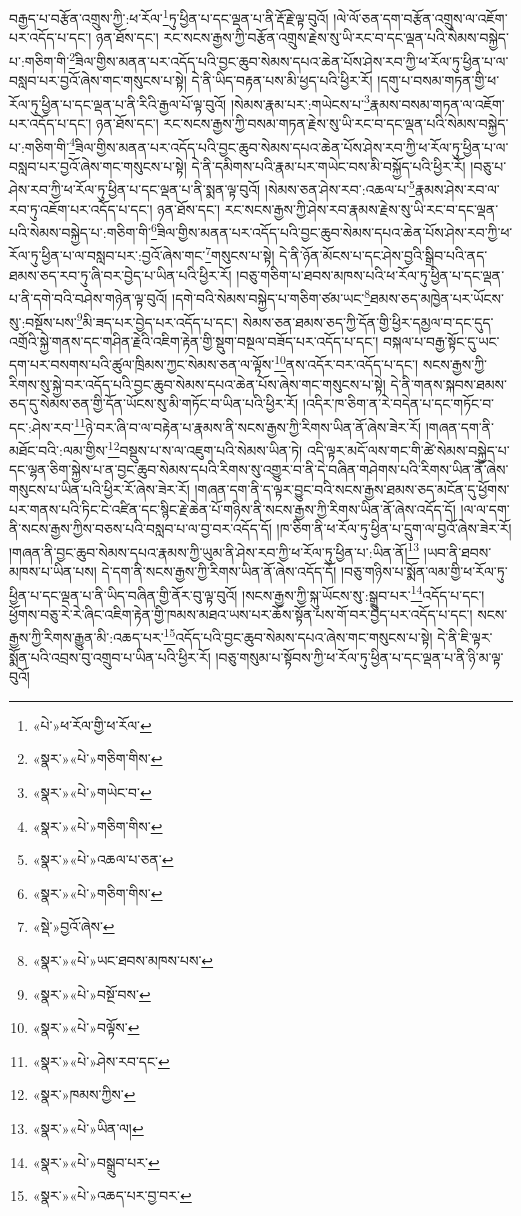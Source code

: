 བརྒྱད་པ་བརྩོན་འགྲུས་ཀྱི་:ཕ་རོལ་\footnote{«པེ་»ཕ་རོལ་གྱི་ཕ་རོལ་}ཏུ་ཕྱིན་པ་དང་ལྡན་པ་ནི་རྡོ་རྗེ་ལྟ་བུའོ། །ལེ་ལོ་ཅན་དག་བརྩོན་འགྲུས་ལ་འཇོག་པར་འདོད་པ་དང་། ཉན་ཐོས་དང་། རང་སངས་རྒྱས་ཀྱི་བརྩོན་འགྲུས་རྗེས་སུ་ཡི་རང་བ་དང་ལྡན་པའི་སེམས་བསྐྱེད་པ་:གཅིག་གི་\footnote{«སྣར་»«པེ་»གཅིག་གིས་}ཟིལ་གྱིས་མནན་པར་འདོད་པའི་བྱང་ཆུབ་སེམས་དཔའ་ཆེན་པོས་ཤེས་རབ་ཀྱི་ཕ་རོལ་ཏུ་ཕྱིན་པ་ལ་བསླབ་པར་བྱའོ་ཞེས་གང་གསུངས་པ་སྟེ། དེ་ནི་ཡིད་བརྟན་པས་མི་ཕྱད་པའི་ཕྱིར་རོ། །དགུ་པ་བསམ་གཏན་གྱི་ཕ་རོལ་ཏུ་ཕྱིན་པ་དང་ལྡན་པ་ནི་རིའི་རྒྱལ་པོ་ལྟ་བུའོ། །སེམས་རྣམ་པར་:གཡེངས་པ་\footnote{«སྣར་»«པེ་»གཡེང་བ་}རྣམས་བསམ་གཏན་ལ་འཇོག་པར་འདོད་པ་དང་། ཉན་ཐོས་དང་། རང་སངས་རྒྱས་ཀྱི་བསམ་གཏན་རྗེས་སུ་ཡི་རང་བ་དང་ལྡན་པའི་སེམས་བསྐྱེད་པ་:གཅིག་གི་\footnote{«སྣར་»«པེ་»གཅིག་གིས་}ཟིལ་གྱིས་མནན་པར་འདོད་པའི་བྱང་ཆུབ་སེམས་དཔའ་ཆེན་པོས་ཤེས་རབ་ཀྱི་ཕ་རོལ་ཏུ་ཕྱིན་པ་ལ་བསླབ་པར་བྱའོ་ཞེས་གང་གསུངས་པ་སྟེ། དེ་ནི་དམིགས་པའི་རྣམ་པར་གཡེང་བས་མི་བསྐྱོད་པའི་ཕྱིར་རོ། །བཅུ་པ་ཤེས་རབ་ཀྱི་ཕ་རོལ་ཏུ་ཕྱིན་པ་དང་ལྡན་པ་ནི་སྨན་ལྟ་བུའོ། །སེམས་ཅན་ཤེས་རབ་:འཆལ་པ་\footnote{«སྣར་»«པེ་»འཆལ་པ་ཅན་}རྣམས་ཤེས་རབ་ལ་རབ་ཏུ་འཇོག་པར་འདོད་པ་དང་། ཉན་ཐོས་དང་། རང་སངས་རྒྱས་ཀྱི་ཤེས་རབ་རྣམས་རྗེས་སུ་ཡི་རང་བ་དང་ལྡན་པའི་སེམས་བསྐྱེད་པ་:གཅིག་གི་\footnote{«སྣར་»«པེ་»གཅིག་གིས་}ཟིལ་གྱིས་མནན་པར་འདོད་པའི་བྱང་ཆུབ་སེམས་དཔའ་ཆེན་པོས་ཤེས་རབ་ཀྱི་ཕ་རོལ་ཏུ་ཕྱིན་པ་ལ་བསླབ་པར་:བྱའོ་ཞེས་གང་\footnote{«སྡེ་»བྱའོ་ཞེས་}གསུངས་པ་སྟེ། དེ་ནི་ཉོན་མོངས་པ་དང་ཤེས་བྱའི་སྒྲིབ་པའི་ནད་ཐམས་ཅད་རབ་ཏུ་ཞི་བར་བྱེད་པ་ཡིན་པའི་ཕྱིར་རོ། །བཅུ་གཅིག་པ་ཐབས་མཁས་པའི་ཕ་རོལ་ཏུ་ཕྱིན་པ་དང་ལྡན་པ་ནི་དགེ་བའི་བཤེས་གཉེན་ལྟ་བུའོ། །དགེ་བའི་སེམས་བསྐྱེད་པ་གཅིག་ཙམ་ཡང་\footnote{«སྣར་»«པེ་»ཡང་ཐབས་མཁས་པས་}ཐམས་ཅད་མཁྱེན་པར་ཡོངས་སུ་:བསྔོས་པས་\footnote{«སྣར་»«པེ་»བསྔོ་བས་}མི་ཟད་པར་བྱེད་པར་འདོད་པ་དང་། སེམས་ཅན་ཐམས་ཅད་ཀྱི་དོན་གྱི་ཕྱིར་དམྱལ་བ་དང་དུད་འགྲོའི་སྐྱེ་གནས་དང་གཤིན་རྗེའི་འཇིག་རྟེན་གྱི་སྡུག་བསྔལ་བཟོད་པར་འདོད་པ་དང་། བསྐལ་པ་བརྒྱ་སྟོང་དུ་ཡང་དག་པར་བསགས་པའི་ཚུལ་ཁྲིམས་ཀྱང་སེམས་ཅན་ལ་ལྟོས་\footnote{«སྣར་»«པེ་»བལྟོས་}ནས་འདོར་བར་འདོད་པ་དང་། སངས་རྒྱས་ཀྱི་རིགས་སུ་སྐྱེ་བར་འདོད་པའི་བྱང་ཆུབ་སེམས་དཔའ་ཆེན་པོས་ཞེས་གང་གསུངས་པ་སྟེ། དེ་ནི་གནས་སྐབས་ཐམས་ཅད་དུ་སེམས་ཅན་གྱི་དོན་ཡོངས་སུ་མི་གཏོང་བ་ཡིན་པའི་ཕྱིར་རོ། །འདིར་ཁ་ཅིག་ན་རེ་བདེན་པ་དང་གཏོང་བ་དང་:ཤེས་རབ་\footnote{«སྣར་»«པེ་»ཤེས་རབ་དང་}ཉེ་བར་ཞི་བ་ལ་བརྟེན་པ་རྣམས་ནི་སངས་རྒྱས་ཀྱི་རིགས་ཡིན་ནོ་ཞེས་ཟེར་རོ། །གཞན་དག་ནི་མཐོང་བའི་:ལམ་གྱིས་\footnote{«སྣར་»ཁམས་ཀྱིས་}བསྡུས་པ་ས་ལ་འཇུག་པའི་སེམས་ཡིན་ཏེ། འདི་ལྟར་མདོ་ལས་གང་གི་ཚེ་སེམས་བསྐྱེད་པ་དང་ལྷན་ཅིག་སྐྱེས་པ་ན་བྱང་ཆུབ་སེམས་དཔའི་རིགས་སུ་འགྱུར་བ་ནི་དེ་བཞིན་གཤེགས་པའི་རིགས་ཡིན་ནོ་ཞེས་གསུངས་པ་ཡིན་པའི་ཕྱིར་རོ་ཞེས་ཟེར་རོ། །གཞན་དག་ནི་ད་ལྟར་བྱུང་བའི་སངས་རྒྱས་ཐམས་ཅད་མངོན་དུ་ཕྱོགས་པར་གནས་པའི་ཏིང་ངེ་འཛིན་དང་སྙིང་རྗེ་ཆེན་པོ་གཉིས་ནི་སངས་རྒྱས་ཀྱི་རིགས་ཡིན་ནོ་ཞེས་འདོད་དོ། །ལ་ལ་དག་ནི་སངས་རྒྱས་ཀྱིས་བཅས་པའི་བསླབ་པ་ལ་བྱ་བར་འདོད་དོ། །ཁ་ཅིག་ནི་ཕ་རོལ་ཏུ་ཕྱིན་པ་དྲུག་ལ་བྱའོ་ཞེས་ཟེར་རོ། །གཞན་ནི་བྱང་ཆུབ་སེམས་དཔའ་རྣམས་ཀྱི་ཡུམ་ནི་ཤེས་རབ་ཀྱི་ཕ་རོལ་ཏུ་ཕྱིན་པ་:ཡིན་ནོ།\footnote{«སྣར་»«པེ་»ཡིན་ལ།} །ཡབ་ནི་ཐབས་མཁས་པ་ཡིན་པས། དེ་དག་ནི་སངས་རྒྱས་ཀྱི་རིགས་ཡིན་ནོ་ཞེས་འདོད་དོ། །བཅུ་གཉིས་པ་སྨོན་ལམ་གྱི་ཕ་རོལ་ཏུ་ཕྱིན་པ་དང་ལྡན་པ་ནི་ཡིད་བཞིན་གྱི་ནོར་བུ་ལྟ་བུའོ། །སངས་རྒྱས་ཀྱི་སྐུ་ཡོངས་སུ་:སྒྲུབ་པར་\footnote{«སྣར་»«པེ་»བསྒྲུབ་པར་}འདོད་པ་དང་། ཕྱོགས་བཅུ་རེ་རེ་ཞིང་འཇིག་རྟེན་གྱི་ཁམས་མཐའ་ཡས་པར་ཆོས་སྟོན་པས་གོ་བར་བྱེད་པར་འདོད་པ་དང་། སངས་རྒྱས་ཀྱི་རིགས་རྒྱུན་མི་:འཆད་པར་\footnote{«སྣར་»«པེ་»འཆད་པར་བྱ་བར་}འདོད་པའི་བྱང་ཆུབ་སེམས་དཔའ་ཞེས་གང་གསུངས་པ་སྟེ། དེ་ནི་ཇི་ལྟར་སྨོན་པའི་འབྲས་བུ་འགྲུབ་པ་ཡིན་པའི་ཕྱིར་རོ། །བཅུ་གསུམ་པ་སྟོབས་ཀྱི་ཕ་རོལ་ཏུ་ཕྱིན་པ་དང་ལྡན་པ་ནི་ཉི་མ་ལྟ་བུའོ། 